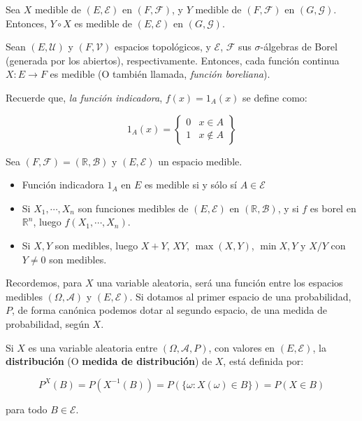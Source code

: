 \begin{theorem} 
	Sea $X$ medible de $(E, \mathcal{E})$ en $(F, \mathcal{F})$, y $Y$ medible de $(F, \mathcal{F})$ en $(G, \mathcal{G})$. Entonces, $Y \circ X$ es medible de $(E, \mathcal{E})$ en $(G, \mathcal{G})$.
\end{theorem}

\begin{theorem}
	Sean $(E, \mathcal{U})$ y $(F, \mathcal{V})$ espacios topológicos, y $\mathcal{E}$, $\mathcal{F}$ sus $\sigma$-álgebras de Borel (generada por los abiertos), respectivamente. Entonces, cada función continua $X: E \rightarrow F$ es medible (O también llamada, \textit{función boreliana}).
\end{theorem}

Recuerde que, \textit{la función indicadora}, $f(x) = 1_A (x)$ se define como:

\[
	1_A (x) = \left\{  \begin{array}{lc}
		0 & x \in A \\
		1 & x \notin A
	\end{array} \right\}
\]

\begin{theorem}
	Sea $(F, \mathcal{F}) = (\mathbb{R}, \mathcal{B})$ y $(E, \mathcal{E})$ un espacio medible.

	\begin{itemize}
		\item Función indicadora $1_A$ en $E$ es medible si y sólo sí $A \in \mathcal{E}$
		\item Si $X_1, \cdots, X_n$ son funciones medibles de $(E, \mathcal{E})$ en $(\mathbb{R}, \mathcal{B})$, y si $f$ es borel en $\mathbb{R}^n$, luego $f(X_1, \cdots, X_n)$.
		\item Si $X, Y$ son medibles, luego $X + Y$, $XY$, $\max(X,Y)$, $\min{X,Y}$ y $X/Y$ con $Y \neq 0$ son medibles.
	\end{itemize}

\end{theorem}

Recordemos, para $X$ una variable aleatoria, será una función entre los espacios medibles $(\Omega, \mathcal{A})$ y $(E, \mathcal{E})$. Si dotamos al primer espacio de una probabilidad, $P$, de forma canónica podemos dotar al segundo espacio, de una medida de probabilidad, según $X$.

\begin{boxDef}
	Si $X$ es una variable aleatoria entre $(\Omega, \mathcal{A}, P)$, con valores en $(E, \mathcal{E})$, la \textbf{distribución} (O \textbf{medida de distribución}) de $X$, está definida por:

	\[
		P^{X} (B) = P(X^{-1} (B)) =  P(\{ \omega : X(\omega) \in B \}) = P(X \in B)
	\] 

	para todo $B \in \mathcal{E}$. 
\end{boxDef}

